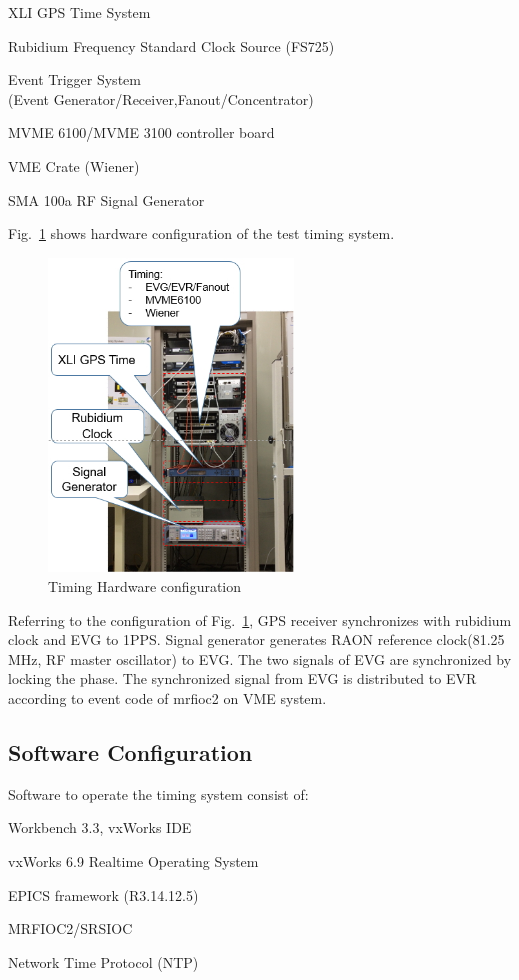 \documentclass[a4paper,
              ]{jacow}
\begin{document}
\begin{Itemize}
	\item XLI GPS Time System
	\item Rubidium Frequency Standard Clock Source (FS725)
	\item Event Trigger System \\
	(Event Generator/Receiver,Fanout/Concentrator)
	\item MVME 6100/MVME 3100 controller board 
	\item VME Crate (Wiener)
	\item SMA 100a RF Signal Generator
\end{Itemize}
\hfil\break
Fig.~\ref{timing:rack} shows hardware configuration of the test timing system. 
\begin{figure}[!htb]
	\centering
	\includegraphics*[width=65mm]{timing_rack}
	\caption{Timing Hardware configuration }
	\label{timing:rack}
\end{figure}

Referring to the configuration of Fig.~\ref{timing:rack}, GPS receiver synchronizes with rubidium clock and EVG to 1PPS. Signal generator generates RAON reference clock(81.25 MHz, RF master oscillator) to EVG. The two signals of EVG are synchronized by locking the phase. The synchronized signal from EVG is distributed to EVR according to event code of mrfioc2 on VME system.

\subsection{Software Configuration}
Software to operate the timing system consist of:
\begin{Itemize}
	\item Workbench 3.3, vxWorks IDE
	\item vxWorks 6.9 Realtime Operating System
	\item EPICS framework (R3.14.12.5)
	\item MRFIOC2/SRSIOC 
	\item Network Time Protocol (NTP)
\end{Itemize}
\end{document}
